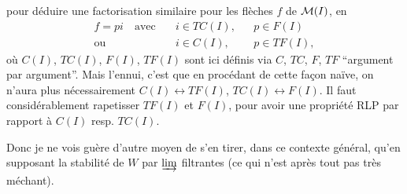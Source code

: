 pour déduire une factorisation similaire pour les flèches $f$ de $\mathcal{M}(I)$, en
\[
\begin{aligned}
f = pi \quad \text{avec}\quad & i \in TC(I), && p \in F(I)\\
\text{ou}\quad & i \in C(I), && p \in TF(I),
\end{aligned}
\]
où $C(I)$, $TC(I)$, $F(I)$, $TF(I)$ sont ici définis via $C$, $TC$, $F$, $TF$ “argument par argument”. Mais l'ennui, c'est que en procédant de cette façon naïve, on n'aura plus nécessairement $C(I) \longleftrightarrow TF(I)$, $TC(I) \longleftrightarrow F(I)$. Il faut considérablement rapetisser $TF(I)$ et $F(I)$, pour avoir une propriété RLP par rapport à $C(I)$ resp. $TC(I)$.

Donc je ne vois guère d'autre moyen de s'en tirer, dans ce contexte général, qu'en supposant la stabilité de $W$ par $\mathop{\underrightarrow{\mathrm{lim}}}$ filtrantes (ce qui n'est après tout pas très méchant).

\noindent{}


